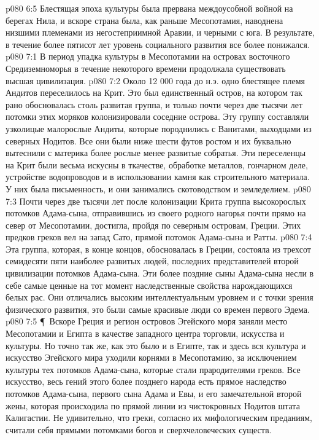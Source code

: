 \vs p080 6:5 Блестящая эпоха культуры была прервана междоусобной войной на берегах Нила, и вскоре страна была, как раньше Месопотамия, наводнена низшими племенами из негостеприимной Аравии, и черными с юга. В результате, в течение более пятисот лет уровень социального развития все более понижался.
\vs p080 7:1 В период упадка культуры в Месопотамии на островах восточного Средиземноморья в течение некоторого времени продолжала существовать высшая цивилизация.
\vs p080 7:2 Около 12 000 года до н.э. одно блестящее племя Андитов переселилось на Крит. Это был единственный остров, на котором так рано обосновалась столь развитая группа, и только почти через две тысячи лет потомки этих моряков колонизировали соседние острова. Эту группу составляли узколицые малорослые Андиты, которые породнились с Ванитами, выходцами из северных Нодитов. Все они были ниже шести футов ростом и их буквально вытеснили с материка более рослые менее развитые собратья. Эти переселенцы на Крит были весьма искусны в ткачестве, обработке металлов, гончарном деле, устройстве водопроводов и в использовании камня как строительного материала. У них была письменность, и они занимались скотоводством и земледелием.
\vs p080 7:3 Почти через две тысячи лет после колонизации Крита группа высокорослых потомков Адама\hyp{}сына, отправившись из своего родного нагорья почти прямо на север от Месопотамии, достигла, пройдя по северным островам, Греции. Этих предков греков вел на запад Сато, прямой потомок Адама\hyp{}сына и Ратты.
\vs p080 7:4 Эта группа, которая, в конце концов, обосновалась в Греции, состояла из трехсот семидесяти пяти наиболее развитых людей, последних представителей второй цивилизации потомков Адама\hyp{}сына. Эти более поздние сыны Адама\hyp{}сына несли в себе самые ценные на тот момент наследственные свойства нарождающихся белых рас. Они отличались высоким интеллектуальным уровнем и с точки зрения физического развития, это были самые красивые люди со времен первого Эдема.
\vs p080 7:5 \P\ Вскоре Греция и регион островов Эгейского моря заняли место Месопотамии и Египта в качестве западного центра торговли, искусства и культуры. Но точно так же, как это было и в Египте, так и здесь вся культура и искусство Эгейского мира уходили корнями в Месопотамию, за исключением культуры тех потомков Адама\hyp{}сына, которые стали прародителями греков. Все искусство, весь гений этого более позднего народа есть прямое наследство потомков Адама\hyp{}сына, первого сына Адама и Евы, и его замечательной второй жены, которая происходила по прямой линии из чистокровных Нодитов штата Калигастии. Не удивительно, что греки, согласно их мифологическим преданиям, считали себя прямыми потомками богов и сверхчеловеческих существ.
